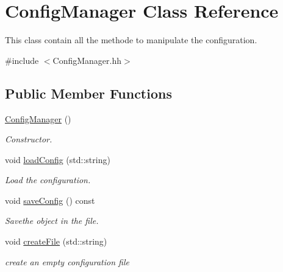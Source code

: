 \hypertarget{classConfigManager}{}\section{Config\+Manager Class Reference}
\label{classConfigManager}


This class contain all the methode to manipulate the configuration.  




{\ttfamily \#include $<$Config\+Manager.\+hh$>$}

\subsection*{Public Member Functions}
\begin{DoxyCompactItemize}
\item 
\hyperlink{classConfigManager_a7d3d7c10423d969f7544509f6fcca32f}{Config\+Manager} ()
\begin{DoxyCompactList}\small\item\em Constructor. \end{DoxyCompactList}\item 
void \hyperlink{classConfigManager_a63ff6c831f037cf5bfe580b4944b0b6c}{load\+Config} (std\+::string)
\begin{DoxyCompactList}\small\item\em Load the configuration. \end{DoxyCompactList}\item 
\mbox{\label{classConfigManager_a178e051860792271e9b1ec4434776f91}} 
void \hyperlink{classConfigManager_a178e051860792271e9b1ec4434776f91}{save\+Config} () const
\begin{DoxyCompactList}\small\item\em Savethe object in the file. \end{DoxyCompactList}\item 
void \hyperlink{classConfigManager_a4f2b06f2ef741a15b3dfe82259cfd355}{create\+File} (std\+::string)
\begin{DoxyCompactList}\small\item\em create an empty configuration file \end{DoxyCompactList}\end{DoxyCompactItemize}
